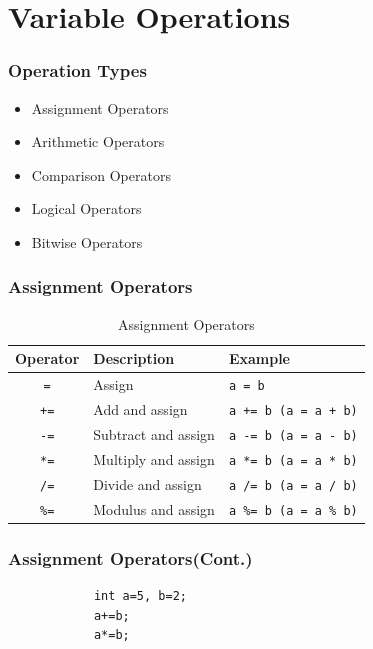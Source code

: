 \documentclass[xcolor=dvipsnames]{beamer}
\begin{document}
    \section{Variable Operations}
    \begin{frame}
        \frametitle{Operation Types}
        \begin{itemize}
            \item Assignment Operators
            \item Arithmetic Operators
            \item Comparison Operators
            \item Logical Operators
            \item Bitwise Operators
        \end{itemize}
    \end{frame}

    \begin{frame}
        \frametitle{Assignment Operators}
        \begin{table}[h]
        \centering
        \caption{Assignment Operators}
        \begin{tabular}{cll}
        \toprule
        \textbf{Operator} & \textbf{Description} & \textbf{Example} \\
         \midrule
              \texttt{=}   & Assign & \texttt{a = b} \\
                \texttt{+=}  & Add and assign & \texttt{a += b (a = a + b)} \\
                \texttt{-=}  & Subtract and assign & \texttt{a -= b (a = a - b)} \\
                \texttt{*=}  & Multiply and assign & \texttt{a *= b (a = a * b)} \\
                \texttt{/=}  & Divide and assign & \texttt{a /= b (a = a / b)} \\
                \texttt{\%=}  & Modulus and assign & \texttt{a \%= b (a = a \% b)} \\
        \bottomrule
        \end{tabular}
        \end{table}
    \end{frame}
    \begin{frame}[fragile]
        \frametitle{Assignment Operators(Cont.)}
        \begin{verbatim}
            int a=5, b=2;
            a+=b;
            a*=b;
        \end{verbatim}
    \end{frame}
\end{document}
